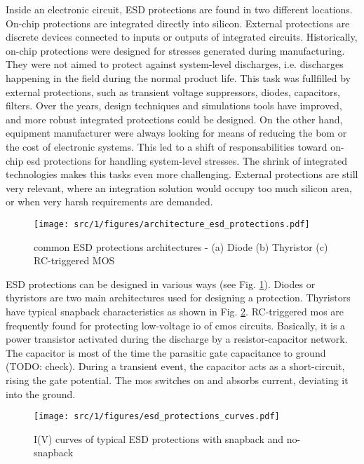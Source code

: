 Inside an electronic circuit, ESD protections are found in two different locations.
On-chip protections are integrated directly into silicon.
External protections are discrete devices connected to inputs or outputs of integrated circuits.
Historically, on-chip protections were designed for stresses generated during manufacturing.
They were not aimed to protect against system-level discharges, i.e. discharges happening in the field during the normal product life.
This task was fullfilled by external protections, such as transient voltage suppressors, diodes, capacitors, filters.
Over the years, design techniques and simulations tools have improved, and more robust integrated protections could be designed.
On the other hand, equipment manufacturer were always looking for means of reducing the \gls{bom} or the cost of electronic systems.
This led to a shift of responsabilities toward on-chip \gls{esd} protections for handling system-level stresses.
The shrink of integrated technologies makes this tasks even more challenging.
External protections are still very relevant, where an integration solution would occupy too much silicon area, or when very harsh requirements are demanded.

\begin{figure}[!h]
  \centering
  \texttt{[image: src/1/figures/architecture\_esd\_protections.pdf]}
  \caption{common ESD protections architectures - (a) Diode (b) Thyristor (c) RC-triggered MOS}
  \label{fig:architecture-esd-protection}
\end{figure}

ESD protections can be designed in various ways (see Fig. \ref{fig:architecture-esd-protection}).
Diodes or thyristors are two main architectures used for designing a protection.
Thyristors have typical snapback characteristics as shown in Fig. \ref{fig:iv-curve-esd-protection}.
RC-triggered \gls{mos} are frequently found for protecting low-voltage \gls{io} of \gls{cmos} circuits.
Basically, it is a power transistor activated during the discharge by a resistor-capacitor network.
The capacitor is most of the time the parasitic gate capacitance to ground (TODO: check).
During a transient event, the capacitor acts as a short-circuit, rising the gate potential.
The \gls{mos} switches on and absorbs current, deviating it into the ground.

\begin{figure}[!h]
  \centering
  \texttt{[image: src/1/figures/esd\_protections\_curves.pdf]}
  \caption{I(V) curves of typical ESD protections with snapback and no-snapback}
  \label{fig:iv-curve-esd-protection}
\end{figure}

